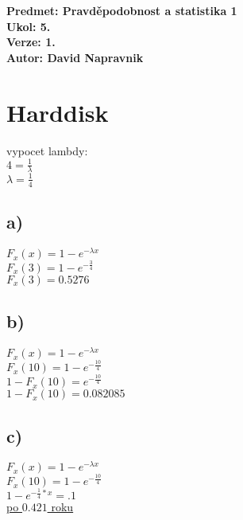 \documentclass[a4paper]{article}
\def\doubleunderline#1{\underline{\underline{#1}}}
\begin{document}
\noindent
\textbf{Predmet: Pravděpodobnost a statistika 1}\\
\textbf{Ukol: 5.}\\
\textbf{Verze: 1.}\\
\textbf{Autor: David Napravnik}

\section*{Harddisk}

vypocet lambdy:\\
$4 = \frac{1}{\lambda}$\\
$\lambda = \frac{1}{4}$

\subsection*{a)}
$F_x(x) = 1 - e^{-\lambda x}$\\
$F_x(3) = 1 - e^{-\frac{3}{4}}$\\
\doubleunderline{$F_x(3) = 0.5276$}\\


\subsection*{b)}
$F_x(x) = 1 - e^{-\lambda x}$\\
$F_x(10) = 1 - e^{-\frac{10}{4}}$\\
$1-F_x(10) = e^{-\frac{10}{4}}$\\
\doubleunderline{$1-F_x(10) = 0.082085$}\\




\subsection*{c)}
$F_x(x) = 1 - e^{-\lambda x}$\\
$F_x(10) = 1 - e^{-\frac{10}{4}}$\\
$1-e^{-\frac{1}{4} * x} = .1$\\
\doubleunderline{po $0.421$ roku}\\
\end{document}

